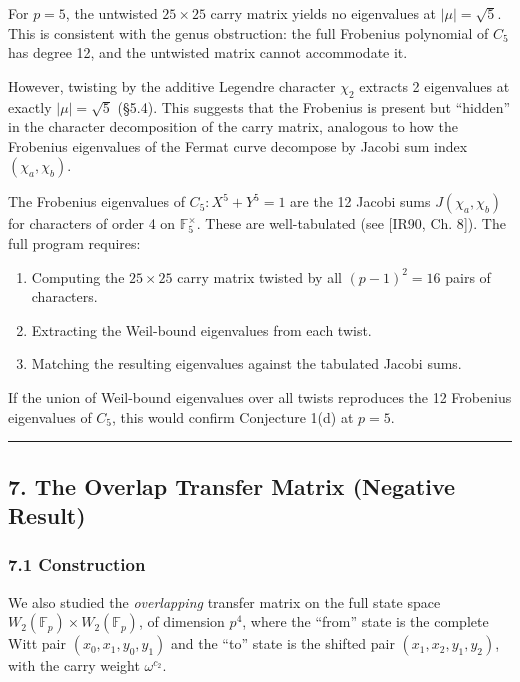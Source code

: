 \documentclass[
  11pt,
]{article}
\providecommand{\tightlist}{%
  \setlength{\itemsep}{0pt}\setlength{\parskip}{0pt}}
\begin{document}
For \(p = 5\), the untwisted \(25 \times 25\) carry matrix yields no eigenvalues
at \(\lvert\mu\rvert = \sqrt{5}\). This is consistent with the genus
obstruction: the full Frobenius polynomial of \(C_5\) has degree 12, and the
untwisted matrix cannot accommodate it.

However, twisting by the additive Legendre character \(\chi_2\) extracts 2
eigenvalues at exactly \(\lvert\mu\rvert = \sqrt{5}\) (§5.4). This suggests that
the Frobenius is present but ``hidden'' in the character decomposition of the
carry matrix, analogous to how the Frobenius eigenvalues of the Fermat curve
decompose by Jacobi sum index \((\chi_a, \chi_b)\).

The Frobenius eigenvalues of \(C_5: X^5 + Y^5 = 1\) are the 12 Jacobi sums
\(J(\chi_a, \chi_b)\) for characters of order 4 on \(\mathbb{F}_5^\times\).
These are well-tabulated (see {[}IR90, Ch. 8{]}). The full program requires:

\begin{enumerate}
\def\labelenumi{\arabic{enumi}.}
\tightlist
\item
  Computing the \(25 \times 25\) carry matrix twisted by all \((p-1)^2 = 16\)
  pairs of characters.
\item
  Extracting the Weil-bound eigenvalues from each twist.
\item
  Matching the resulting eigenvalues against the tabulated Jacobi sums.
\end{enumerate}

If the union of Weil-bound eigenvalues over all twists reproduces the 12
Frobenius eigenvalues of \(C_5\), this would confirm Conjecture 1(d) at
\(p = 5\).

\begin{center}\rule{0.5\linewidth}{0.5pt}\end{center}

\newpage

\subsection{7. The Overlap Transfer Matrix (Negative
Result)}\label{the-overlap-transfer-matrix-negative-result}

\subsubsection{7.1 Construction}\label{construction}

We also studied the \emph{overlapping} transfer matrix on the full state space
\(W_2(\mathbb{F}_p) \times W_2(\mathbb{F}_p)\), of dimension \(p^4\), where the
``from'' state is the complete Witt pair \((x_0, x_1, y_0, y_1)\) and the ``to''
state is the shifted pair \((x_1, x_2, y_1, y_2)\), with the carry weight
\(\omega^{c_2}\).
\end{document}
